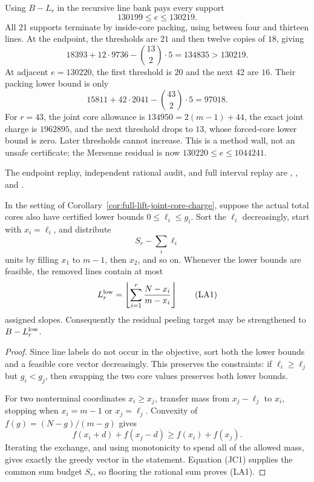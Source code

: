 \documentclass[11pt,a4paper]{amsart}
\numberwithin{equation}{section}
\theoremstyle{remark}
\begin{document}
\begin{remark}
Using \(B-L_r\) in the recursive line bank pays every support
\[
 130199\le e\le130219.
\]
All 21 supports terminate by inside-core packing, using between four and
thirteen lines.  At the endpoint, the thresholds are \(21\) and then twelve
copies of \(18\), giving
\[
 18393+12\cdot9736-\binom{13}{2}\cdot5
 =134835>130219.
\]
At adjacent \(e=130220\), the first threshold is \(20\) and the next 42 are
\(16\).  Their packing lower bound is only
\[
 15811+42\cdot2041-\binom{43}{2}\cdot5
 =97018.
\]
For \(r=43\), the joint core allowance is
\(134950=2(m-1)+44\), the exact joint charge is \(1962895\), and the next
threshold drops to \(13\), whose forced-core lower bound is zero.  Later
thresholds cannot increase.  This is a method wall, not an unsafe
certificate; the Mersenne residual is now
\(130220\le e\le1044241\).

The endpoint replay, independent rational audit, and full interval replay
are
,
,
and
.
\end{remark}

\begin{corollary}
\label{cor:full-lift-lower-aware-joint-core-charge}
In the setting of
Corollary~\ref{cor:full-lift-joint-core-charge}, suppose the actual total
cores also have certified lower bounds
\(0\le\ell_i\le g_i\).  Sort the \(\ell_i\) decreasingly, start with
\(x_i=\ell_i\), and distribute
\[
 S_r-\sum_i\ell_i
\]
units by filling \(x_1\) to \(m-1\), then \(x_2\), and so on.  Whenever
the lower bounds are feasible, the removed lines contain at most
\[
 L_r^{\rm low}=\left\lfloor\sum_{i=1}^r
          \frac{N-x_i}{m-x_i}\right\rfloor              \tag{LA1}
\]
assigned slopes.  Consequently the residual peeling target may be
strengthened to \(B-L_r^{\rm low}\).
\end{corollary}

\begin{proof}
Since line labels do not occur in the objective, sort both the lower bounds
and a feasible core vector decreasingly.  This preserves the constraints:
if \(\ell_i\ge\ell_j\) but \(g_i<g_j\), then swapping the two core values
preserves both lower bounds.

For two nonterminal coordinates \(x_i\ge x_j\), transfer mass from
\(x_j-\ell_j\) to \(x_i\), stopping when \(x_i=m-1\) or
\(x_j=\ell_j\).  Convexity of
\(f(g)=(N-g)/(m-g)\) gives
\[
 f(x_i+d)+f(x_j-d)\ge f(x_i)+f(x_j).
\]
Iterating the exchange, and using monotonicity to spend all of the allowed
mass, gives exactly the greedy vector in the statement.  Equation (JC1)
supplies the common sum budget \(S_r\), so flooring the rational sum proves
(LA1).
\end{proof}
\end{document}
